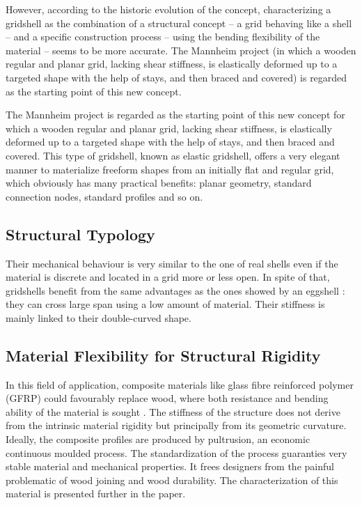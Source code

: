 However, according to the historic evolution of the concept, characterizing a gridshell as the combination of a structural concept -- a grid behaving like a shell -- and a specific construction process -- using the bending flexibility of the material -- seems to be more accurate. The Mannheim project (in which a wooden regular and planar grid, lacking shear stiffness, is elastically deformed up to a targeted shape with the help of stays, and then braced and covered) is regarded as the starting point of this new concept.

The Mannheim project is regarded as the starting point of this new concept for which a wooden regular and planar grid, lacking shear stiffness, is elastically deformed up to a targeted shape with the help of stays, and then braced and covered.
This type of gridshell, known as elastic gridshell, offers a very elegant manner to materialize freeform shapes from an initially flat and regular grid, which obviously has many practical benefits: planar geometry, standard connection nodes, standard profiles and so on.


\subsection{Structural Typology}
Their mechanical behaviour is very similar to the one of real shells even if the material is discrete and located in a grid more or less open. In spite of that, gridshells benefit from the same advantages as the ones showed by an eggshell : they can cross large span using a low amount of material. Their stiffness is mainly linked to their double-curved shape.


\subsection{Material Flexibility for Structural Rigidity}
In this field of application, composite materials like glass fibre reinforced polymer (GFRP) could favourably replace wood, where both resistance and bending ability of the material is sought \cite{Douthe2010a}. The stiffness of the structure does not derive from the intrinsic material rigidity but principally from its geometric curvature. Ideally, the composite profiles are produced by pultrusion, an economic continuous moulded process. The standardization of the process guaranties very stable material and mechanical properties. It frees designers from the painful problematic of wood joining and wood durability. The characterization of this material is presented further in the paper.

